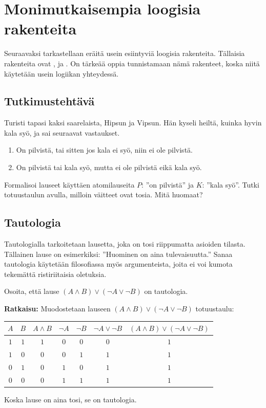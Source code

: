 \newpage

\section{Monimutkaisempia loogisia rakenteita}
\label{monimloog}
Seuraavaksi tarkastellaan eräitä usein esiintyviä loogisia rakenteita. Tällaisia rakenteita ovat ,  ja . On tärkeää oppia tunnistamaan nämä rakenteet, koska niitä käytetään usein logiikan yhteydessä.

\subsection*{Tutkimustehtävä}
Turisti tapasi kaksi saarelaista, Hipsun ja Vipsun. Hän kyseli heiltä, kuinka hyvin kala syö, ja sai seuraavat vastaukset.
\begin{enumerate}
\item On pilvistä, tai sitten jos kala ei syö, niin ei ole pilvistä.
\item On pilvistä tai kala syö, mutta ei ole pilvistä eikä kala syö.
\end{enumerate}
Formalisoi lauseet käyttäen atomilauseita $P$: ''on pilvistä'' ja $K$: ''kala syö''. Tutki totuustaulun avulla, milloin väitteet ovat tosia. Mitä huomaat?

\subsection*{Tautologia}
Tautologialla tarkoitetaan lausetta, joka on tosi riippumatta asioiden tilasta. Tällainen lause on esimerkiksi: ''Huominen on aina tulevaisuutta.'' Sanaa tautologia käytetään filosofiassa myös argumenteista, joita ei voi kumota tekemättä ristiriitaisia oletuksia.

\begin{esimerkki}
Osoita, että lause $(A\land B)\lor (\lnot A \lor \lnot B)$ on
tautologia.

{\bf Ratkaisu:}
Muodostetaan lauseen $(A\land B)\lor (\lnot A \lor \lnot
B)$ totuustaulu:

\begin{center}
\begin{tabular}{|c|c|c|c|c|c|c|}\hline
$A$ & $B$ & $A\land B$ & $\lnot A$ & $\lnot B$ & $ \lnot
A \lor \lnot B $ & $(A\land B)\lor (\lnot A \lor \lnot B)$
\\ \hline
$1$ & $1$ & $1$ & $0$ & $0$ & $0$ & $1$ \\ %
$1$ & $0$ & $0$ & $0$ & $1$ & $1$ & $1$ \\
$0$ & $1$ & $0$ & $1$ & $0$ & $1$ & $1$ \\
$0$ & $0$ & $0$ & $1$ & $1$ & $1$ & $1$ \\ \hline
\end{tabular}
\end{center}

Koska lause on aina tosi, se on tautologia.
\end{esimerkki}

